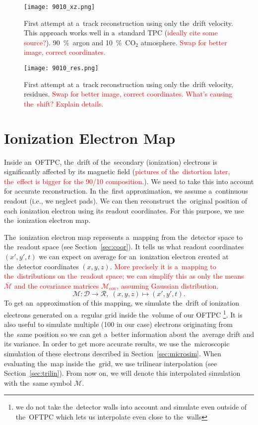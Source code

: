 		\begin{figure}[H]
			\centering
			\texttt{[image: 9010\_xz.png]}
			\caption{First attempt at a~track reconstruction using only the~drift velocity. This approach works well in a~standard \ac{TPC} (\textcolor{red}{ideally cite some source?}). 90~\%~argon and 10~\%~CO$_2$ atmosphere. \textcolor{red}{Swap for better image, correct coordinates.}}
			\label{fig:9010xz}
		\end{figure}
		
		\begin{figure}[H]
			\centering
			\texttt{[image: 9010\_res.png]}
			\caption{First attempt at a~track reconstruction using only the~drift velocity, residues. \textcolor{red}{Swap for better image, correct coordinates. What's causing the~shift? Explain details.}}
			\label{fig:9010res}
		\end{figure}
	
	\section{Ionization Electron Map}
	\label{sec:map}
		Inside an~\ac{OFTPC}, the~drift of the~secondary (ionization) electrons is significantly affected by its magnetic field (\textcolor{red}{pictures of the~distortion later, the~effect is bigger for the 90/10 composition.}). We need to take this into account for accurate reconstruction. In the~first approximation, we assume a~continuous readout (i.e., we neglect pads). We can then reconstruct the~original position of each ionization electron using its readout coordinates. For this purpose, we use the~ionization electron map.
		
		The~ionization electron map represents a~mapping from the~detector space to the~readout space (see Section~\ref{sec:coor}). It tells us what readout coordinates $(x',y',t)$ we can expect on average for an~ionization electron created at the~detector coordinates $(x,y,z)$. \textcolor{red}{More precisely it is a~mapping to the~distributions on the~readout space; we can simplify this as only the means $\overbar{\mathcal{M}}$ and the covariance matrices $\mathcal{M}_\text{cov}$, assuming Gaussian distribution.}
			\begin{equation}
				\mathcal{M}: \mathcal{D} \longrightarrow \mathcal{R},\; (x,y,z) \longmapsto (x',y',t).
			\end{equation}
		To get an~approximation of this mapping, we simulate the~drift of ionization electrons generated on a~regular grid inside the~volume of our \ac{OFTPC} \footnote{we do not take the~detector walls into account and simulate even outside of the~\ac{OFTPC} which lets us interpolate even close to the~walls}. It is also useful to simulate multiple (100 in our case) electrons originating from the~same position so we can get a~better information about the~average drift and its variance. In order to get more accurate results, we use the~microscopic simulation of these electrons described in Section~\ref{sec:microsim}. When evaluating the~map inside the~grid, we use trilinear interpolation (see Section~\ref{sec:trilin}). From now on, we will denote this interpolated simulation with the~same symbol $\mathcal{M}$.
		

